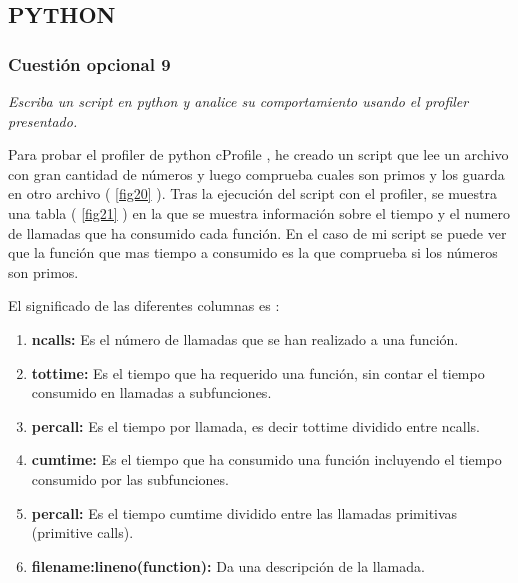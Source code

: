 \subsection{PYTHON}
\subsubsection{Cuestión opcional 9}
\textit{Escriba un script en python y analice su comportamiento usando el profiler presentado.}
\newline

Para probar el profiler de python cProfile \cite{cprofile}, he creado un script que lee un archivo con gran cantidad de números y luego comprueba cuales son primos y los guarda en otro archivo ( \cref{fig20} ). Tras la ejecución del script con el profiler, se muestra una tabla ( \cref{fig21} ) en la que se muestra información sobre el tiempo y el numero de llamadas que ha consumido cada función. En el caso de mi script se puede ver que la función que mas tiempo a consumido es la que comprueba si los números son primos.
\newline

El significado de las diferentes columnas es \cite{cprofile}:
\begin{enumerate}
  \item \textbf{ncalls:} Es el número de llamadas que se han realizado a una función.
  \item \textbf{tottime:} Es el tiempo que ha requerido una función, sin contar el tiempo consumido en llamadas a subfunciones.
  \item \textbf{percall:} Es el tiempo por llamada, es decir tottime dividido entre ncalls.
  \item \textbf{cumtime:} Es el tiempo que ha consumido una función incluyendo el tiempo consumido por las subfunciones.
  \item \textbf{percall:} Es el tiempo cumtime dividido entre las llamadas primitivas (primitive calls).
  \item \textbf{filename:lineno(function):} Da una descripción de la llamada.
\end{enumerate}

